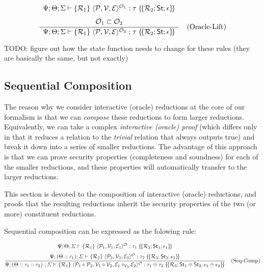 \[
\frac{%
  \begin{array}{c}
    \Psi; \Theta; \Sigma \vdash \{\mathcal{R}_1\} \; \langle\mathcal{P}, \mathcal{V}, \mathcal{E}\rangle^{\mathcal{O}_1} : \tau \; \{\!\{\mathcal{R}_2; \mathsf{St}; \epsilon\}\!\} \\[1.5ex]
    \mathcal{O}_1 \subset \mathcal{O}_2
  \end{array}%
}{%
  \Psi; \Theta; \Sigma \vdash \{\mathcal{R}_1\} \; \langle\mathcal{P}, \mathcal{V}, \mathcal{E}\rangle^{\mathcal{O}_2} : \tau \; \{\!\{\mathcal{R}_2; \mathsf{St}; \epsilon\}\!\}
} \quad \text{(Oracle-Lift)}
\]

TODO: figure out how the state function needs to change for these rules (they are basically the same, but not exactly)

\subsection{Sequential Composition}

The reason why we consider interactive (oracle) reductions at the core of our formalism is that we
can \emph{compose} these reductions to form larger reductions. Equivalently, we can take a complex
\emph{interactive (oracle) proof} (which differs only in that it reduces a relation to the
\emph{trivial} relation that always outputs true) and break it down into a series of smaller
reductions. The advantage of this approach is that we can prove security properties (completeness
and soundness) for each of the smaller reductions, and these properties will automatically transfer
to the larger reductions.

This section is devoted to the composition of interactive (oracle) reductions, and proofs that the
resulting reductions inherit the security properties of the two (or more) constituent reductions.

Sequential composition can be expressed as the folowing rule:

\[
\frac{%
  \begin{array}{c}
    \Psi; \Theta; \varSigma \vdash \{\mathcal{R}_1\} \; \langle\mathcal{P}_1, \mathcal{V}_1, \mathcal{E}_1\rangle^{\mathcal{O}} : \tau_1 \; \{\!\{\mathcal{R}_2; \mathsf{St}_1; \epsilon_1\}\!\} \\[1.5ex]
    \Psi; (\Theta :: \tau_1) ; \varSigma \vdash \{\mathcal{R}_2\} \; \langle\mathcal{P}_2, \mathcal{V}_2, \mathcal{E}_2\rangle^{\mathcal{O}} : \tau_2 \; \{\!\{\mathcal{R}_3; \mathsf{St}_2; \epsilon_2\}\!\}
  \end{array}%
}{%
  \Psi; (\Theta :: \tau_1 :: \tau_2) \ ; \varSigma \vdash \{\mathcal{R}_1\} \; \langle\mathcal{P}_1 \circ \mathcal{P}_2, \mathcal{V}_1 \circ \mathcal{V}_2, \mathcal{E}_1 \circ_{\mathcal{V}_2} \mathcal{E}_2\rangle^{\mathcal{O}} : \tau_1 \oplus \tau_2 \; \{\!\{\mathcal{R}_3; \mathsf{St}_1 \oplus \mathsf{St}_2; \epsilon_1 \oplus \epsilon_2\}\!\}
} \quad \text{(Seq-Comp)}
\]


